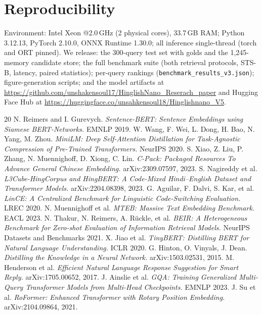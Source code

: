 \documentclass[11pt]{article}
\begin{document}
\section*{Reproducibility}
Environment: Intel Xeon @2.0\,GHz (2 physical cores), 33.7\,GB RAM; Python 3.12.13, PyTorch 2.10.0, ONNX Runtime 1.30.0; all inference single-thread (torch and ORT pinned). We release: the 300-query test set with golds and the 1{,}245-memory candidate store; the full benchmark suite (both retrieval protocols, STS-B, latency, paired statistics); per-query rankings (\texttt{benchmark\_results\_v3.json}); figure-generation scripts; and the model artifacts at \url{https://github.com/unshakensoul17/HinglishNano_Reserach_paper} and Hugging Face Hub at \url{https://huggingface.co/unsahkensoul18/Hinglishnano_V5}.
\begin{thebibliography}{20}\small
{} N. Reimers and I. Gurevych. \emph{Sentence-BERT: Sentence Embeddings using Siamese BERT-Networks.} EMNLP 2019.
 W. Wang, F. Wei, L. Dong, H. Bao, N. Yang, M. Zhou. \emph{MiniLM: Deep Self-Attention Distillation for Task-Agnostic Compression of Pre-Trained Transformers.} NeurIPS 2020.
 S. Xiao, Z. Liu, P. Zhang, N. Muennighoff, D. Xiong, C. Lin. \emph{C-Pack: Packaged Resources To Advance General Chinese Embedding.} arXiv:2309.07597, 2023.
 S. Nagireddy et al. \emph{L3Cube-HingCorpus and HingBERT: A Code-Mixed Hindi--English Dataset and Transformer Models.} arXiv:2204.08398, 2023.
 G. Aguilar, F. Dalvi, S. Kar, et al. \emph{LinCE: A Centralized Benchmark for Linguistic Code-Switching Evaluation.} LREC 2020.
 N. Muennighoff et al. \emph{MTEB: Massive Text Embedding Benchmark.} EACL 2023.
 N. Thakur, N. Reimers, A. R\"uckle, et al. \emph{BEIR: A Heterogeneous Benchmark for Zero-shot Evaluation of Information Retrieval Models.} NeurIPS Datasets and Benchmarks 2021.
 X. Jiao et al. \emph{TinyBERT: Distilling BERT for Natural Language Understanding.} ICLR 2020.
 G. Hinton, O. Vinyals, J. Dean. \emph{Distilling the Knowledge in a Neural Network.} arXiv:1503.02531, 2015.
 M. Henderson et al. \emph{Efficient Natural Language Response Suggestion for Smart Reply.} arXiv:1705.00652, 2017.   %
 J. Ainslie et al. \emph{GQA: Training Generalized Multi-Query Transformer Models from Multi-Head Checkpoints.} EMNLP 2023.
 J. Su et al. \emph{RoFormer: Enhanced Transformer with Rotary Position Embedding.} arXiv:2104.09864, 2021.

\end{thebibliography}
\end{document}
